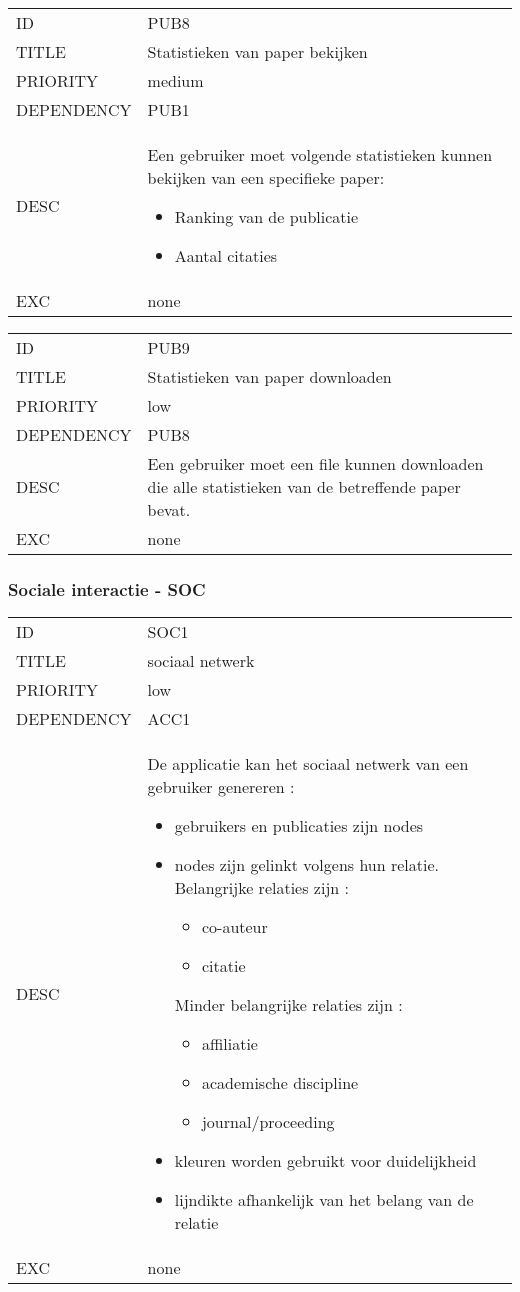 \begin{longtable}{lp{10cm}}
ID           & PUB8\\
TITLE        & Statistieken van paper bekijken\\
PRIORITY     & medium\\
DEPENDENCY   & PUB1\\
DESC         & Een gebruiker moet volgende statistieken kunnen bekijken van een specifieke paper:
\begin{itemize}
\item Ranking van de publicatie
\item Aantal citaties
\end{itemize}\\
EXC          & none     
\end{longtable}

\begin{longtable}{lp{10cm}}
ID           & PUB9\\
TITLE        & Statistieken van paper downloaden\\
PRIORITY     & low\\
DEPENDENCY   & PUB8\\
DESC         & Een gebruiker moet een file kunnen downloaden die alle statistieken van de betreffende paper bevat.\\
EXC          & none          
\end{longtable}

\subsubsection{Sociale interactie - SOC}

\begin{longtable}{lp{10cm}}
ID           & SOC1\\
TITLE        & sociaal netwerk\\
PRIORITY     & low\\
DEPENDENCY   & ACC1\\
DESC         & De applicatie kan het sociaal netwerk van een gebruiker genereren :
\begin{itemize}
\item gebruikers en publicaties zijn nodes
\item nodes zijn gelinkt volgens hun relatie.
Belangrijke relaties zijn :
\begin{itemize}
\item co-auteur
\item citatie
\end{itemize}
Minder belangrijke relaties zijn :
\begin{itemize}
\item affiliatie
\item academische discipline
\item journal/proceeding
\end{itemize}
\item kleuren worden gebruikt voor duidelijkheid
\item lijndikte afhankelijk van het belang van de relatie
\end{itemize}\\
EXC          & none
\end{longtable}

